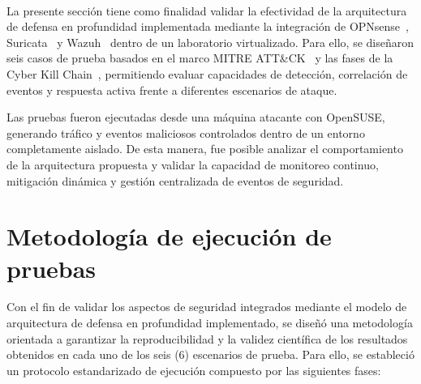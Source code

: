 \label{cap:validacion}
\mbox{}\\
La presente sección tiene como finalidad validar la efectividad de la arquitectura de defensa en profundidad implementada mediante la 
integración de OPNsense~\cite{OpnsenseManual2026}, Suricata~\cite{SuricataGuide2025} y Wazuh~\cite{WazuhDocs2026} dentro de un laboratorio 
virtualizado. Para ello, se diseñaron seis casos de prueba basados en el marco MITRE ATT\&CK~\cite{MITREATTACK2026} y las fases de la Cyber 
Kill Chain~\cite{CyberKillChain2026}, permitiendo evaluar capacidades de detección, correlación de eventos y respuesta activa frente a 
diferentes escenarios de ataque.

Las pruebas fueron ejecutadas desde una máquina atacante con OpenSUSE, generando tráfico y eventos maliciosos controlados dentro de un 
entorno completamente aislado. De esta manera, fue posible analizar el comportamiento de la arquitectura propuesta y validar la capacidad 
de monitoreo continuo, mitigación dinámica y gestión centralizada de eventos de seguridad.

\section{Metodología de ejecución de pruebas}
\noindent

Con el fin de validar los aspectos de seguridad integrados mediante el modelo de arquitectura de defensa en profundidad implementado, se 
diseñó una metodología orientada a garantizar la reproducibilidad y la validez científica de los resultados obtenidos en cada uno de los 
seis (6) escenarios de prueba. Para ello, se estableció un protocolo estandarizado de ejecución compuesto por las siguientes fases:


